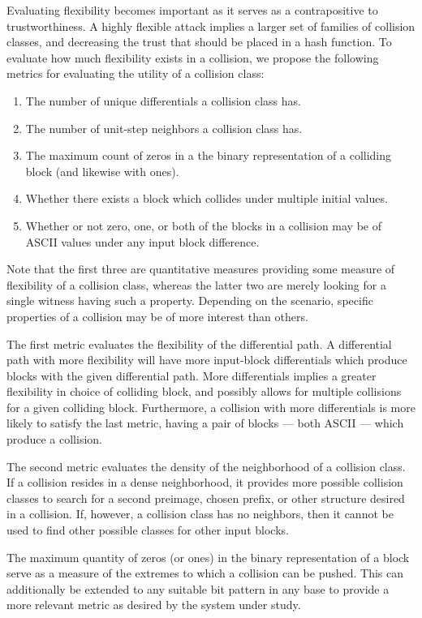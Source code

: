 \documentclass[conference]{IEEEtran}
\begin{document}
Evaluating flexibility becomes important as it serves as a
contrapositive to trustworthiness.  A highly flexible attack implies a
larger set of families of collision classes, and decreasing the trust
that should be placed in a hash function. To evaluate how much flexibility exists in a collision,
we propose the following metrics for evaluating the utility of a collision
class:
\begin{enumerate}
    \item The number of unique differentials a collision class has.
    \item The number of unit-step neighbors a collision class has.
    \item The maximum count of zeros in a the binary representation of a
        colliding block (and likewise with ones).
    \item Whether there exists a block which collides under multiple initial
        values.
    \item Whether or not zero, one, or both of the blocks in a collision may
        be of ASCII values under any input block difference.
\end{enumerate}
Note that the first three are quantitative measures providing some measure of
flexibility of a collision class, whereas the latter two are merely looking
for a single witness having such a property. Depending on the scenario,
specific properties of a collision may be of more interest than others.

The first metric evaluates the flexibility of the differential path. A
differential path with more flexibility will have more input-block differentials which
produce blocks with the given differential path. More differentials implies
a greater flexibility in choice of colliding block, and possibly allows
for multiple collisions for a given colliding block. Furthermore, a collision
with more differentials is more likely to satisfy the last metric, having a
pair of blocks --- both ASCII --- which produce a collision.

The second metric evaluates the density of the neighborhood of a collision
class. If a collision resides in a dense neighborhood, it provides more
possible collision classes to search for a second preimage, chosen prefix, or
other structure desired in a collision. If, however, a collision class has no
neighbors, then it cannot be used to find other possible classes for other
input blocks.

The maximum quantity of zeros (or ones) in the binary representation of a
block serve as a measure of the extremes to which a collision can be pushed.
This can additionally be extended to any suitable bit pattern in any base to
provide a more relevant metric as desired by the system under study.
\end{document}
